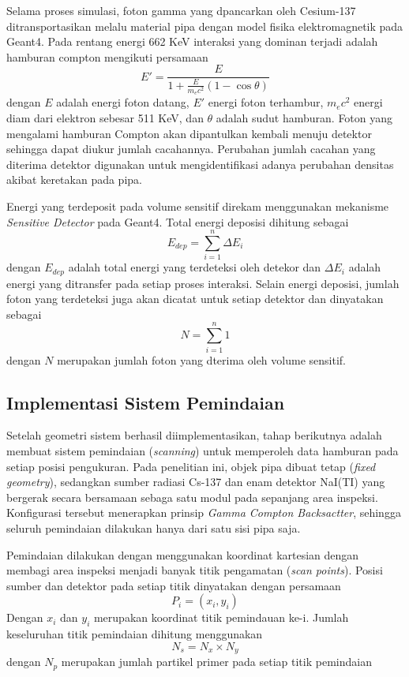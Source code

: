 \documentclass[12pt,a4paper]{report}
\begin{document}
Selama proses simulasi, foton gamma yang dpancarkan oleh Cesium-137 ditransportasikan melalu material pipa dengan model fisika elektromagnetik pada Geant4. Pada rentang energi 662 KeV interaksi yang dominan terjadi adalah hamburan compton 
mengikuti persamaan 
\begin{equation}
    E' = \frac{E}{1 + \frac{E}{m_e c^2}(1 - \cos\theta)}
\end{equation}
dengan $E$ adalah energi foton datang, $E'$ energi foton terhambur, $m_e c^2$ energi diam dari elektron sebesar 511 KeV, dan $\theta$ adalah sudut hamburan. Foton yang mengalami hamburan Compton akan dipantulkan kembali menuju detektor sehingga 
dapat diukur jumlah cacahannya. Perubahan jumlah cacahan yang diterima detektor digunakan untuk mengidentifikasi adanya perubahan densitas akibat keretakan pada pipa.

Energi yang terdeposit pada volume sensitif direkam menggunakan mekanisme \textit{Sensitive Detector} pada Geant4. Total energi deposisi dihitung sebagai 
\begin{equation}
    E_{dep} = \sum_{i=1}^{n} \Delta E_i
\end{equation}
dengan $E_{dep}$ adalah total energi yang terdeteksi oleh detekor dan $\Delta E_i$ adalah energi yang ditransfer pada setiap proses interaksi. Selain energi deposisi, jumlah foton yang terdeteksi juga akan dicatat untuk setiap detektor dan dinyatakan sebagai 
\begin{equation}
    N = \sum_{i=1}^{n} 1
\end{equation}
dengan $N$ merupakan jumlah foton yang dterima oleh volume sensitif.

\subsection{Implementasi Sistem Pemindaian}
Setelah geometri sistem berhasil diimplementasikan, tahap berikutnya adalah membuat sistem pemindaian (\textit{scanning}) untuk memperoleh data hamburan pada setiap posisi pengukuran. Pada penelitian ini, objek pipa dibuat tetap (\textit{fixed geometry}), sedangkan 
sumber radiasi Cs-137 dan enam detektor NaI(TI) yang bergerak secara bersamaan sebaga satu modul pada sepanjang area inspeksi. Konfigurasi tersebut menerapkan prinsip \textit{Gamma Compton Backsactter}, sehingga seluruh pemindaian dilakukan hanya dari satu sisi pipa saja.

Pemindaian dilakukan dengan menggunakan koordinat kartesian dengan membagi area inspeksi menjadi banyak titik pengamatan (\textit{scan points}). Posisi sumber dan detektor pada setiap titik dinyatakan dengan persamaan \
\begin{equation}
    P_i = (x_i, y_i)
\end{equation}
Dengan $x_i$ dan $y_i$ merupakan koordinat titik pemindauan ke-i. Jumlah keseluruhan titik pemindaian dihitung menggunakan
\begin{equation}
    N_s = N_x \times N_y
\end{equation}
dengan $N_p$ merupakan jumlah partikel primer pada setiap titik pemindaian 
\end{document}
